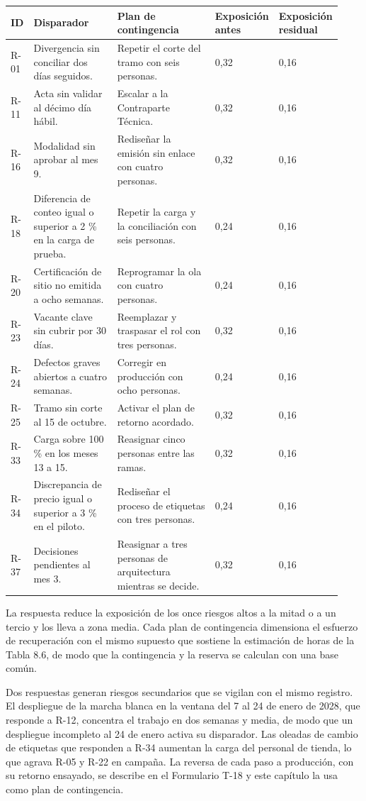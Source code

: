 \documentclass[11pt]{article}
\begin{document}
\begin{longtable}{p{0.066\linewidth}p{0.275\linewidth}p{0.323\linewidth}p{0.133\linewidth}p{0.133\linewidth}}
\toprule
\textbf{ID} & \textbf{Disparador} & \textbf{Plan de contingencia} & \textbf{Exposición antes} & \textbf{Exposición residual} \\
\midrule
\endhead
\bottomrule
\endlastfoot
R-01 & Divergencia sin conciliar dos días seguidos. & Repetir el corte del tramo con seis personas. & 0,32 & 0,16 \\
R-11 & Acta sin validar al décimo día hábil. & Escalar a la Contraparte Técnica. & 0,32 & 0,16 \\
R-16 & Modalidad sin aprobar al mes 9. & Rediseñar la emisión sin enlace con cuatro personas. & 0,32 & 0,16 \\
R-18 & Diferencia de conteo igual o superior a 2 \% en la carga de prueba. & Repetir la carga y la conciliación con seis personas. & 0,24 & 0,16 \\
R-20 & Certificación de sitio no emitida a ocho semanas. & Reprogramar la ola con cuatro personas. & 0,24 & 0,16 \\
R-23 & Vacante clave sin cubrir por 30 días. & Reemplazar y traspasar el rol con tres personas. & 0,32 & 0,16 \\
R-24 & Defectos graves abiertos a cuatro semanas. & Corregir en producción con ocho personas. & 0,24 & 0,16 \\
R-25 & Tramo sin corte al 15 de octubre. & Activar el plan de retorno acordado. & 0,32 & 0,16 \\
R-33 & Carga sobre 100 \% en los meses 13 a 15. & Reasignar cinco personas entre las ramas. & 0,32 & 0,16 \\
R-34 & Discrepancia de precio igual o superior a 3 \% en el piloto. & Rediseñar el proceso de etiquetas con tres personas. & 0,24 & 0,16 \\
R-37 & Decisiones pendientes al mes 3. & Reasignar a tres personas de arquitectura mientras se decide. & 0,32 & 0,16 \\
\end{longtable}

La respuesta reduce la exposición de los once riesgos altos a la mitad o a un tercio y los lleva a zona media. Cada plan de contingencia dimensiona el esfuerzo de recuperación con el mismo supuesto que sostiene la estimación de horas de la Tabla 8.6, de modo que la contingencia y la reserva se calculan con una base común.

Dos respuestas generan riesgos secundarios que se vigilan con el mismo registro. El despliegue de la marcha blanca en la ventana del 7 al 24 de enero de 2028, que responde a R-12, concentra el trabajo en dos semanas y media, de modo que un despliegue incompleto al 24 de enero activa su disparador. Las oleadas de cambio de etiquetas que responden a R-34 aumentan la carga del personal de tienda, lo que agrava R-05 y R-22 en campaña. La reversa de cada paso a producción, con su retorno ensayado, se describe en el Formulario T-18 y este capítulo la usa como plan de contingencia.
\end{document}
